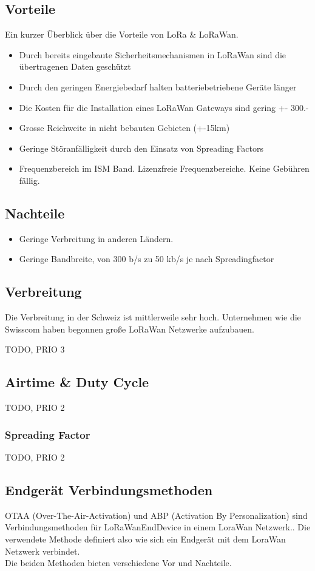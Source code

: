 \documentclass[11pt,english,german]{report}
\theoremstyle{definition}
\begin{document}
\subsection{Vorteile}
Ein kurzer Überblick über die Vorteile von LoRa \& LoRaWan.
\begin{itemize}
	\item Durch bereits eingebaute Sicherheitsmechanismen in LoRaWan sind die übertragenen Daten geschützt
	\item Durch den geringen Energiebedarf halten batteriebetriebene Geräte länger
	\item Die Kosten für die Installation eines LoRaWan Gateways sind gering +- 300.-
	\item Grosse Reichweite in nicht bebauten Gebieten (+-15km)
	\item Geringe Störanfälligkeit durch den Einsatz von Spreading Factors
	\item Frequenzbereich im ISM Band. Lizenzfreie Frequenzbereiche. Keine Gebühren fällig.
\end{itemize}

\subsection{Nachteile}
\begin{itemize}
	\item Geringe Verbreitung in anderen Ländern.
	\item Geringe Bandbreite, von 300 b/s zu 50 kb/s je nach Spreadingfactor
\end{itemize}

\subsection{Verbreitung}
Die Verbreitung in der Schweiz ist mittlerweile sehr hoch. Unternehmen wie die Swisscom haben begonnen große LoRaWan Netzwerke aufzubauen.

TODO, PRIO 3

\subsection{Airtime \& Duty Cycle}
TODO, PRIO 2
\subsubsection{Spreading Factor}
TODO, PRIO 2

\newpage
\subsection{Endgerät Verbindungsmethoden}
OTAA (Over-The-Air-Activation) und ABP (Activation By Personalization) sind Verbindungsmethoden für \gls{LoRaWanEndDevice} in einem LoraWan Netzwerk.\cite{jaguar}. Die verwendete Methode definiert also wie sich ein Endgerät mit dem LoraWan Netzwerk verbindet. \\[0.3cm]
Die beiden Methoden bieten verschiedene Vor und Nachteile.
\end{document}
